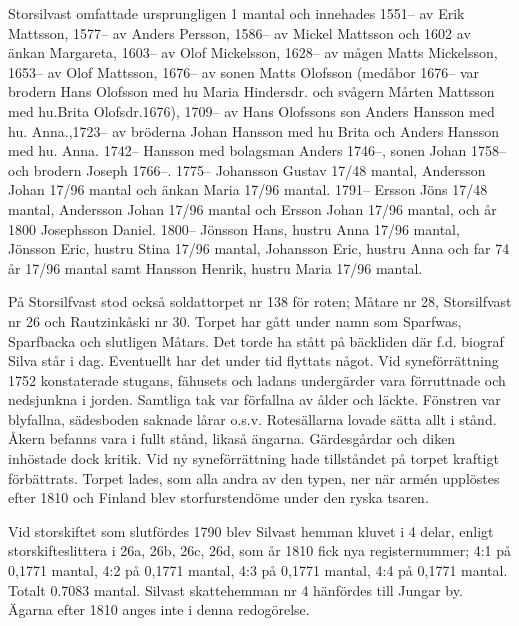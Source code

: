 Storsilvast omfattade ursprungligen 1 mantal och innehades 1551-- av Erik Mattsson, 1577-- av Anders Persson, 1586-- av Mickel Mattsson och 1602 av änkan Margareta, 1603-- av Olof Mickelsson, 1628-- av mågen Matts Mickelsson, 1653-- av Olof Mattsson, 1676-- av sonen Matts Olofsson (medåbor 1676-- var brodern Hans Olofsson med hu Maria Hindersdr. och svågern Mårten Mattsson med hu.Brita Olofsdr.1676), 1709-- av Hans Olofssons son Anders Hansson med hu. Anna.,1723-- av bröderna Johan Hansson med hu Brita och Anders Hansson med hu. Anna.  1742-- Hansson med bolagsman Anders 1746--, sonen Johan	1758-- och brodern Joseph 1766--. 1775--	Johansson Gustav 17/48 mantal, Andersson Johan 17/96 mantal och 	änkan Maria 17/96 mantal.	1791-- 	Ersson Jöns 17/48 mantal, Andersson Johan 17/96 mantal och Ersson Johan 17/96 mantal, och år 1800 Josephsson	Daniel.	1800--	Jönsson Hans, hustru Anna 17/96 mantal, Jönsson Eric,	hustru Stina 17/96 mantal, Johansson Eric, hustru Anna och	far 74 år 17/96 mantal samt Hansson Henrik, hustru Maria 17/96 mantal.

På Storsilfvast stod också soldattorpet nr 138 för roten; Måtare nr 28, Storsilfvast nr 26 och Rautzinkåski nr 30. Torpet har gått under namn som Sparfwas, Sparfbacka och slutligen Måtars. Det torde ha stått på bäckliden där f.d. biograf Silva står i dag. Eventuellt har det under tid flyttats något. Vid syneförrättning 1752 konstaterade stugans, fähusets och ladans undergärder vara förruttnade och nedsjunkna i jorden. Samtliga tak var förfallna av ålder och läckte. Fönstren var blyfallna, sädesboden saknade lårar o.s.v. Rotesällarna lovade sätta allt i stånd. Åkern befanns vara i fullt stånd, likaså ängarna. Gärdesgårdar och diken inhöstade dock kritik. Vid ny syneförrättning hade tillståndet på torpet kraftigt förbättrats. Torpet lades, som alla andra av den typen, ner när armén upplöstes efter 1810 och Finland blev storfurstendöme under den ryska tsaren.


Vid storskiftet som slutfördes 1790 blev Silvast hemman kluvet i 4 delar, enligt storskifteslittera i 26a, 26b, 26c, 26d, som år 1810 fick nya registernummer;	4:1 på 0,1771 mantal,	4:2 på 0,1771 mantal, 4:3 på 0,1771 mantal,	4:4 på 0,1771 mantal. Totalt 0.7083 mantal. Silvast skattehemman nr 4 hänfördes till Jungar by. Ägarna efter 1810 anges inte i denna redogörelse.

